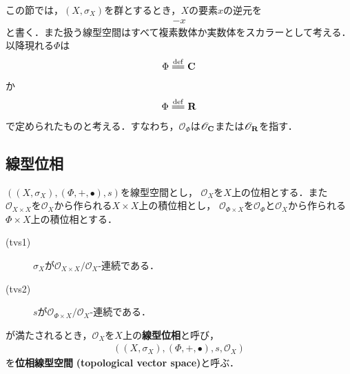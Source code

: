 	この節では，$\left(X,\sigma_X\right)$を群とするとき，$X$の要素$x$の逆元を
	\begin{align}
		-x
	\end{align}
	と書く．また扱う線型空間はすべて複素数体か実数体をスカラーとして考える．以降現れる$\Phi$は
	\begin{align}
		\Phi \defeq \C
	\end{align}
	か
	\begin{align}
		\Phi \defeq \R
	\end{align}
	で定められたものと考える．すなわち，$\mathscr{O}_\Phi$は$\mathscr{O}_{\mathbf{C}}$または$\mathscr{O}_{\mathbf{R}}$を指す．
	
\subsection{線型位相}
	\begin{screen}
		\begin{dfn}[位相線型空間]\label{def:topological_vector_space}
			$\left(\left(X,\sigma_X\right),(\Phi,+,\bullet),s\right)$を線型空間とし，
			$\mathscr{O}_X$を$X$上の位相とする．また
			$\mathscr{O}_{X \times X}$を$\mathscr{O}_X$から作られる$X \times X$上の積位相とし，
			$\mathscr{O}_{\Phi \times X}$を$\mathscr{O}_\Phi$と$\mathscr{O}_X$から作られる$\Phi \times X$上の積位相とする．
			\begin{description}
				\item[(tvs1)] $\sigma_X$が$\mathscr{O}_{X \times X}/\mathscr{O}_X$-連続である．
				\item[(tvs2)] $s$が$\mathscr{O}_{\Phi \times X}/\mathscr{O}_X$-連続である．
			\end{description}
			が満たされるとき，$\mathscr{O}_X$を$X$上の{\bf 線型位相}と呼び，
			\begin{align}
				\left(\left(X,\sigma_X\right),(\Phi,+,\bullet),s,\mathscr{O}_X\right)
				\label{pair_topological_vector_space}
			\end{align}
			を{\bf 位相線型空間}
			{\bf (topological vector space)}と呼ぶ．
		\end{dfn}
	\end{screen}
	
